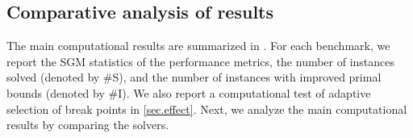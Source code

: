 \subsection{Comparative analysis of results}
\label{sec.mainresult}

The main computational results are summarized in . For each benchmark, we report the SGM statistics of the performance metrics, the number of instances solved (denoted by \#S), and the number of instances with improved primal bounds (denoted by \#I). We also report  a computational test of adaptive selection of break points in \ref{sec.effect}. Next, we analyze the main computational results by comparing the solvers.




